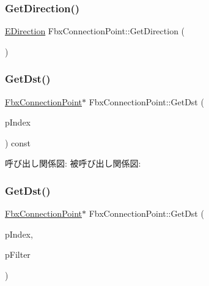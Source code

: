 \subsubsection{\texorpdfstring{Get\+Direction()}{GetDirection()}}
{\footnotesize\ttfamily \hyperlink{class_fbx_connection_point_a39937aa7b1e2137db6384c1e5756dfff}{E\+Direction} Fbx\+Connection\+Point\+::\+Get\+Direction (\begin{DoxyParamCaption}{ }\end{DoxyParamCaption})}

\mbox{\label{class_fbx_connection_point_ad31242315b645c26f4871d3fb33b098f}} 
\subsubsection{\texorpdfstring{Get\+Dst()}{GetDst()}\hspace{0.1cm}{\footnotesize\ttfamily [1/2]}}
{\footnotesize\ttfamily \hyperlink{class_fbx_connection_point}{Fbx\+Connection\+Point}$\ast$ Fbx\+Connection\+Point\+::\+Get\+Dst (\begin{DoxyParamCaption}\item[{int}]{p\+Index }\end{DoxyParamCaption}) const}

呼び出し関係図\+:
被呼び出し関係図\+:
\mbox{\label{class_fbx_connection_point_a79fba15b4e575d9148c701ade1f6e998}} 
\subsubsection{\texorpdfstring{Get\+Dst()}{GetDst()}\hspace{0.1cm}{\footnotesize\ttfamily [2/2]}}
{\footnotesize\ttfamily \hyperlink{class_fbx_connection_point}{Fbx\+Connection\+Point}$\ast$ Fbx\+Connection\+Point\+::\+Get\+Dst (\begin{DoxyParamCaption}\item[{int}]{p\+Index,  }\item[{\hyperlink{class_fbx_connection_point_filter}{Fbx\+Connection\+Point\+Filter} $\ast$}]{p\+Filter }\end{DoxyParamCaption})}


